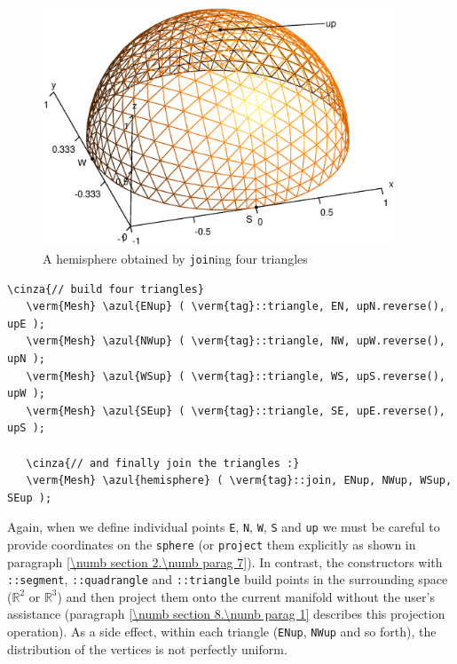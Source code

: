 \begin{figure}[ht] \centering
  \includegraphics[width=105mm]{hemisphere}
  \caption{A hemisphere obtained by {\small\tt join}ing four triangles}
\end{figure}

\begin{Verbatim}[commandchars=\\\{\},formatcom=\small\tt,frame=single,
   label=parag-\ref{\numb section 2.\numb parag 6}.cpp,rulecolor=\color{coment},
   baselinestretch=0.94,framesep=2mm                                            ]
   \cinza{// build four triangles}
   \verm{Mesh} \azul{ENup} ( \verm{tag}::triangle, EN, upN.reverse(), upE );
   \verm{Mesh} \azul{NWup} ( \verm{tag}::triangle, NW, upW.reverse(), upN );
   \verm{Mesh} \azul{WSup} ( \verm{tag}::triangle, WS, upS.reverse(), upW );
   \verm{Mesh} \azul{SEup} ( \verm{tag}::triangle, SE, upE.reverse(), upS );

   \cinza{// and finally join the triangles :}
   \verm{Mesh} \azul{hemisphere} ( \verm{tag}::join, ENup, NWup, WSup, SEup );
\end{Verbatim}

Again, when we define individual points {\small\tt E}, {\small\tt N}, {\small\tt W},
{\small\tt S} and {\small\tt up} we must be careful to provide coordinates on the
{\small\tt sphere} (or {\small\tt project} them explicitly as shown in paragraph
\ref{\numb section 2.\numb parag 7}).
In contrast, the {\small\tt {}} constructors with {\small\tt {}::segment},
{\small\tt {}::quadrangle} and {\small\tt {}::triangle} build points in the
surrounding space ($ \mathbb{R}^2 $ or $ \mathbb{R}^3 $) and
then project them onto the current manifold without the user's assistance (paragraph
\ref{\numb section 8.\numb parag 1} describes this projection operation).
As a side effect, within each triangle ({\small\tt ENup}, {\small\tt NWup} and so forth),
the distribution of the vertices is not perfectly uniform.

